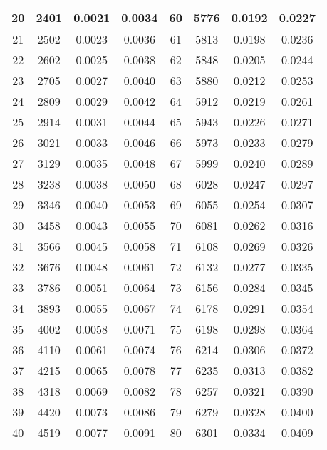 \begin{table}[!h]
\begin{tabular}{|c||c|c|c||c||c|c|c|}
        20 & 2401 & 0.0021 & 0.0034 & 60 & 5776 & 0.0192 & 0.0227 \\\hline 
        21 & 2502 & 0.0023 & 0.0036 & 61 & 5813 & 0.0198 & 0.0236 \\\hline 
        22 & 2602 & 0.0025 & 0.0038 & 62 & 5848 & 0.0205 & 0.0244 \\\hline 
        23 & 2705 & 0.0027 & 0.0040 & 63 & 5880 & 0.0212 & 0.0253 \\\hline 
        24 & 2809 & 0.0029 & 0.0042 & 64 & 5912 & 0.0219 & 0.0261 \\\hline 
        25 & 2914 & 0.0031 & 0.0044 & 65 & 5943 & 0.0226 & 0.0271 \\\hline 
        26 & 3021 & 0.0033 & 0.0046 & 66 & 5973 & 0.0233 & 0.0279 \\\hline 
        27 & 3129 & 0.0035 & 0.0048 & 67 & 5999 & 0.0240 & 0.0289 \\\hline 
        28 & 3238 & 0.0038 & 0.0050 & 68 & 6028 & 0.0247 & 0.0297 \\\hline 
        29 & 3346 & 0.0040 & 0.0053 & 69 & 6055 & 0.0254 & 0.0307 \\\hline
        30 & 3458 & 0.0043 & 0.0055 & 70 & 6081 & 0.0262 & 0.0316 \\\hline
        31 & 3566 & 0.0045 & 0.0058 & 71 & 6108 & 0.0269 & 0.0326 \\\hline
        32 & 3676 & 0.0048 & 0.0061 & 72 & 6132 & 0.0277 & 0.0335 \\\hline
        33 & 3786 & 0.0051 & 0.0064 & 73 & 6156 & 0.0284 & 0.0345 \\\hline
        34 & 3893 & 0.0055 & 0.0067 & 74 & 6178 & 0.0291 & 0.0354 \\\hline
        35 & 4002 & 0.0058 & 0.0071 & 75 & 6198 & 0.0298 & 0.0364 \\\hline
        36 & 4110 & 0.0061 & 0.0074 & 76 & 6214 & 0.0306 & 0.0372 \\\hline
        37 & 4215 & 0.0065 & 0.0078 & 77 & 6235 & 0.0313 & 0.0382 \\\hline
        38 & 4318 & 0.0069 & 0.0082 & 78 & 6257 & 0.0321 & 0.0390 \\\hline
        39 & 4420 & 0.0073 & 0.0086 & 79 & 6279 & 0.0328 & 0.0400 \\\hline
        40 & 4519 & 0.0077 & 0.0091 & 80 & 6301 & 0.0334 & 0.0409 \\\hline
    \end{tabular}
    \label{tab:2}
\end{table}


